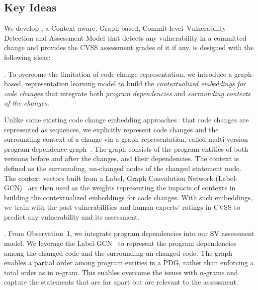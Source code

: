\vspace{-6pt}
\subsection{Key Ideas}
\label{key-ideas:sec}

We develop {\tool}, a Context-aware, Graph-based,
Commit-level~Vulnerability Detection and Assessment Model that
detects any vulnerability in a committed change and provides
the CVSS assessment grades of it if any.
{\tool} is designed with the following ideas:

\vspace{1pt}
. To overcome
the limitation of code change representation, we introduce
a graph-based, representation learning model to build the {\em
contextualized embeddings for code changes} that integrate both {\em
program dependencies} and {\em surrounding contexts of the changes}.

Unlike some existing code change embedding
approaches~\cite{commit2vec} that code changes are represented as
sequences, we explicitly represent code changes and the surrounding
context of a change via a graph representation, called multi-version
program dependence graph~\cite{flexeme-fse20}. The graph consists of
the program entities of both versions before and after the changes,
and their dependencies. The context is defined as the surrounding,
un-changed nodes of the changed statement node. The context vectors
built from a Label, Graph Convolution Network
(Label-GCN)~\cite{label-gcn} are then used as the weights representing
the impacts of contexts in building the contextualized embeddings for
code changes. With such embeddings, we train {\tool} with the past
vulnerabilities and human experts' ratings in CVSS to predict any
vulnerability and its assessment.



\vspace{1pt}
.
From Observation~1, we integrate program dependencies into our SV
assessment model. We leverage the Label-GCN~\cite{label-gcn} to
represent the program dependencies among the changed code and the
surrounding un-changed code.
%
The graph enables a partial order among program entities in a PDG,
rather than enforcing a total order as in $n$-gram.
%
This enables {\tool} overcome the issues
with $n$-grams and capture the statements that
are far apart but are relevant to the assessment.

